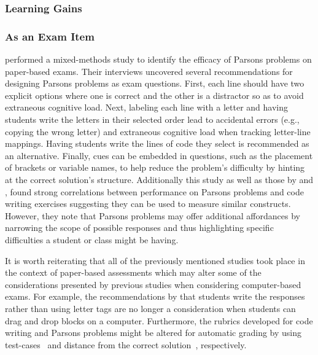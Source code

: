 \documentclass[]{acmart}
\begin{document}
\subsubsection{Learning Gains}

\subsubsection{As an Exam Item}

\citet{denny2008evaluating} performed a mixed-methods study to identify the
efficacy of Parsons problems on paper-based exams. Their interviews uncovered
several recommendations for designing Parsons problems as exam questions. First, each line should
have two explicit options where one is correct and the other is a distractor so
as to avoid extraneous cognitive load. Next, labeling each line with a letter
and having students write the letters in their selected order lead to
accidental errors (e.g., copying the wrong letter) and extraneous cognitive load  when
tracking letter-line mappings. Having students write the lines of code they
select is recommended as an alternative. Finally, cues can be embedded in
questions, such as the placement 
of brackets or variable names, to help reduce the problem's difficulty by hinting at the correct
solution's structure.
Additionally this study as well as those by
\citet{lopez2008relationships} and \citet{lister2010naturally}, found strong
correlations between performance on Parsons problems and code writing exercises
suggesting they can be used to measure similar constructs. However, they note
that Parsons problems may offer additional affordances by narrowing the scope of
possible responses and thus highlighting specific difficulties a student or
class might be having.

It is worth reiterating that all of the previously mentioned studies took place
in the context of paper-based assessments which may alter some of the
considerations presented by previous studies when considering computer-based
exams. For example, the recommendations by \citet{denny2008evaluating} that
students write the responses rather than using letter tags are no longer a
consideration when students can drag and drop blocks on a computer.
Furthermore, the rubrics developed for code writing and Parsons problems might
be altered for automatic grading by using test-cases~\cite{
eddelbuettel2020r} and distance from the correct
solution~\cite{poulsen2022efficient}, respectively. 
\end{document}

